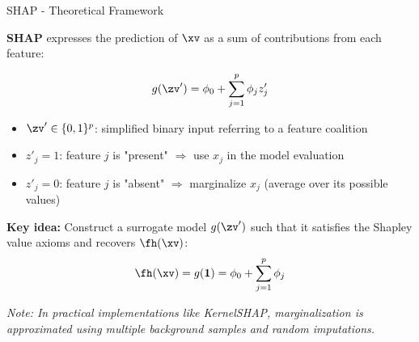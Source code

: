 \documentclass[11pt,compress,t,notes=noshow, aspectratio=169, xcolor=table]{beamer}
\begin{document}
\begin{frame}{SHAP - Theoretical Framework }

\textbf{SHAP} expresses the prediction of $\xv$ as a sum of contributions from each feature:

\[
g(\zv') = \phi_0 + \sum_{j=1}^p \phi_j z'_j
\]

\begin{itemize}
  \item $\zv' \in \{0,1\}^p$: simplified binary input referring to a feature coalition
  \item \(z'_j = 1\): feature $j$ is "present" $\Rightarrow$ use $x_j$ in the model evaluation
  \item \(z'_j = 0\): feature $j$ is "absent" $\Rightarrow$ marginalize $x_j$ (average over its possible values)
\end{itemize}

\vspace{0.5em}
\textbf{Key idea:} Construct a surrogate model $g(\zv')$ such that it satisfies the Shapley value axioms and recovers $\fh(\xv)$:
\[
\fh(\xv) = g(\mathbf{1}) = \phi_0 + \sum_{j=1}^p \phi_j
\]

\textit{Note: In practical implementations like KernelSHAP, marginalization is approximated using multiple background samples and random imputations.}

\end{frame}





\end{document}

